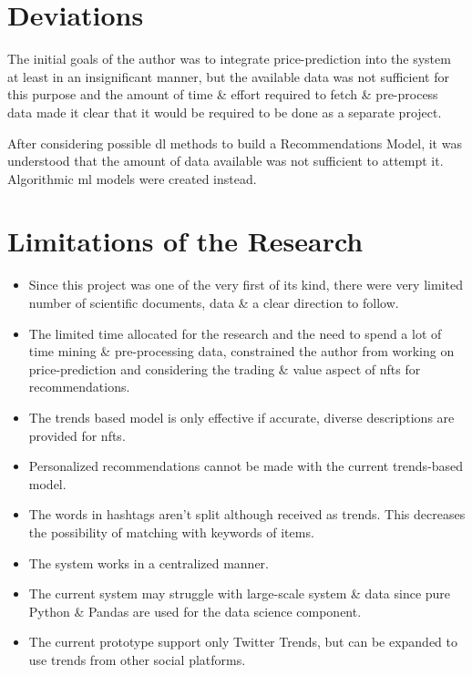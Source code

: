 \section{Deviations}
The initial goals of the author was to integrate price-prediction into the system at least in an insignificant manner, but the available data was not sufficient for this purpose and the amount of time \& effort required to fetch \& pre-process data made it clear that it would be required to be done as a separate project.

After considering possible \gls{dl} methods to build a Recommendations Model, it was understood that the amount of data available was not sufficient to attempt it. Algorithmic \gls{ml} models were created instead.

\section{Limitations of the Research}
\begin{itemize}
\item Since this project was one of the very first of its kind, there were very limited number of scientific documents, data \& a clear direction to follow. 
\item  The limited time allocated for the research and the need to spend a lot of time mining \& pre-processing data, constrained the author from working on price-prediction and considering the trading \& value aspect of \gls{nft}s for recommendations.
\item The trends based model is only effective if accurate, diverse descriptions are provided for \gls{nft}s.
\item Personalized recommendations cannot be made with the current trends-based model.
\item The words in hashtags aren't split although received as trends. This decreases the possibility of matching with keywords of items.
\item The system works in a centralized manner.
\item The current system may struggle with large-scale system \& data since pure Python \& Pandas are used for the data science component.
\item The current prototype support only Twitter Trends, but can be expanded to use trends from other social platforms.
\end{itemize}


